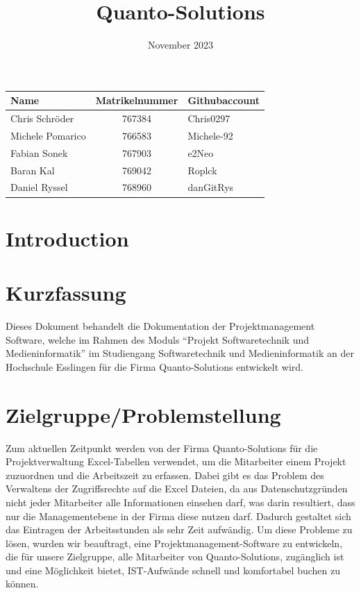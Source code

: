\documentclass{article}
\title{Quanto-Solutions}
\date{November 2023}
\begin{document}
\maketitle


\begin{table}[h]
    \centering
   
    \begin{tabular}{|p{3cm}|c|p{3cm}|}
        \hline
        \textbf{Name} & \textbf{Matrikelnummer} & \textbf{Githubaccount} \\
        \hline
        Chris Schröder    & 767384    & Chris0297  \\
        Michele Pomarico  & 766583    & Michele-92 \\
        Fabian Sonek      & 767903    & e2Neo      \\
        Baran Kal         & 769042    & Roplck     \\
        Daniel Ryssel     & 768960    & danGitRys  \\
        \hline
    \end{tabular}
\end{table}


\newpage

\tableofcontents  %
 
\newpage
\listoffigures  %
\newpage


\section{Introduction}

\section{Kurzfassung}
    Dieses Dokument behandelt die Dokumentation der Projektmanagement Software, welche im Rahmen des Moduls “Projekt Softwaretechnik und Medieninformatik” im Studiengang Softwaretechnik und Medieninformatik an der Hochschule Esslingen für die Firma Quanto-Solutions entwickelt wird.

\newpage



\section{Zielgruppe/Problemstellung}
Zum aktuellen Zeitpunkt werden von der Firma Quanto-Solutions für die Projektverwaltung Excel-Tabellen verwendet, um die Mitarbeiter einem Projekt zuzuordnen und die Arbeitszeit zu erfassen. Dabei gibt es das Problem des Verwaltens der Zugriffsrechte auf die Excel Dateien, da aus Datenschutzgründen nicht jeder Mitarbeiter alle Informationen einsehen darf, was darin resultiert, dass nur die Managementebene in der Firma diese nutzen darf.  Dadurch gestaltet sich das Eintragen der Arbeitsstunden als sehr Zeit aufwändig.
Um diese Probleme zu lösen, wurden wir beauftragt, eine Projektmanagement-Software zu entwickeln, die für unsere Zielgruppe, alle Mitarbeiter von Quanto-Solutions, zugänglich ist und eine Möglichkeit bietet, IST-Aufwände schnell und komfortabel buchen zu können.
\end{document}
